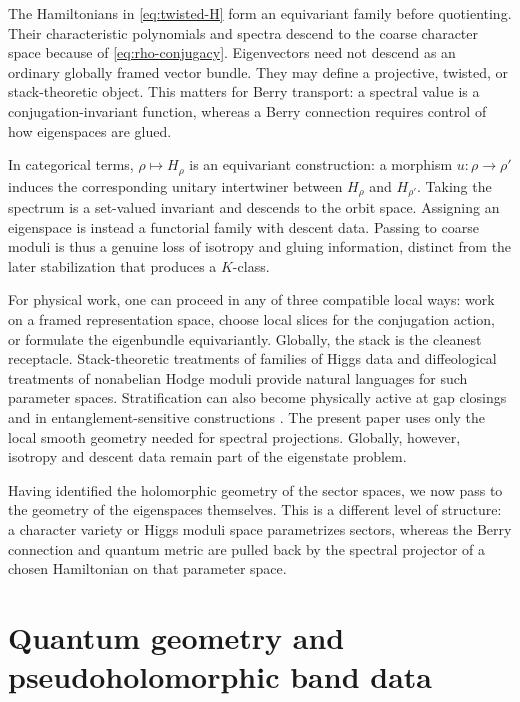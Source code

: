 \documentclass[11pt]{article}
\theoremstyle{definition}
\theoremstyle{remark}
\begin{document}
The Hamiltonians in \eqref{eq:twisted-H} form an equivariant family before
quotienting.  Their characteristic polynomials and spectra descend to the
coarse character space because of \eqref{eq:rho-conjugacy}.  Eigenvectors need
not descend as an ordinary globally framed vector bundle.  They may define a
projective, twisted, or stack-theoretic object.  This matters for Berry
transport: a spectral value is a conjugation-invariant function, whereas a
Berry connection requires control of how eigenspaces are glued.

In categorical terms, \(\rho\mapsto H_\rho\) is an equivariant construction:
a morphism \(u:\rho\to\rho'\) induces the corresponding unitary intertwiner
between \(H_\rho\) and \(H_{\rho'}\).  Taking the spectrum is a
set-valued invariant and descends to the orbit space.  Assigning an eigenspace
is instead a functorial family with descent data.  Passing to coarse moduli is
thus a genuine loss of isotropy and gluing information, distinct from the
later stabilization that produces a \(K\)-class.

For physical work, one can proceed in any of three compatible local ways:
work on a framed representation space, choose local slices for the conjugation
action, or formulate the eigenbundle equivariantly.  Globally, the stack is
the cleanest receptacle.  Stack-theoretic treatments of families of Higgs
data \cite{AzamRayanQuiver2026} and diffeological treatments of nonabelian
Hodge moduli \cite{AzamRayan2026} provide natural languages for such
parameter spaces.  Stratification can also become physically active at gap
closings and in entanglement-sensitive constructions
\cite{IkedaRayan2026}.  The present paper uses only the local smooth geometry
needed for spectral projections.  Globally, however, isotropy and descent
data remain part of the eigenstate problem.

Having identified the holomorphic geometry of the sector spaces, we now pass
to the geometry of the eigenspaces themselves.  This is a different level of
structure: a character variety or Higgs moduli space parametrizes sectors,
whereas the Berry connection and quantum metric are pulled back by the
spectral projector of a chosen Hamiltonian on that parameter space.

\section{Quantum geometry and pseudoholomorphic band data}
\label{sec:quantum-geometry}
\end{document}
